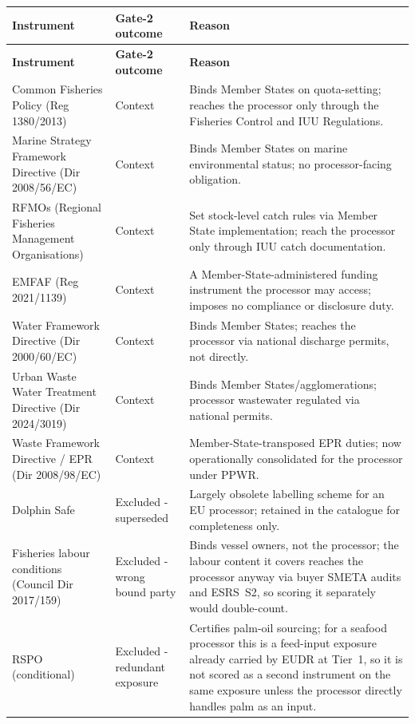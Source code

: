 \documentclass[
]{article}
\begin{document}
\begin{longtable}{@{}p{2.7cm}p{2.3cm}p{6.5cm}@{}}
\toprule
\textbf{Instrument} & \textbf{Gate-2 outcome} & \textbf{Reason} \\
\midrule
\endfirsthead
\toprule
\textbf{Instrument} & \textbf{Gate-2 outcome} & \textbf{Reason} \\
\midrule
\endhead
\bottomrule
\endfoot
Common Fisheries Policy (Reg 1380/2013) & Context & Binds Member States on quota-setting; reaches the processor only through the Fisheries Control and IUU Regulations. \\
Marine Strategy Framework Directive (Dir 2008/56/EC) & Context & Binds Member States on marine environmental status; no processor-facing obligation. \\
RFMOs (Regional Fisheries Management Organisations) & Context & Set stock-level catch rules via Member State implementation; reach the processor only through IUU catch documentation. \\
EMFAF (Reg 2021/1139) & Context & A Member-State-administered funding instrument the processor may access; imposes no compliance or disclosure duty. \\
Water Framework Directive (Dir 2000/60/EC) & Context & Binds Member States; reaches the processor via national discharge permits, not directly. \\
Urban Waste Water Treatment Directive (Dir 2024/3019) & Context & Binds Member States/agglomerations; processor wastewater regulated via national permits. \\
Waste Framework Directive / EPR (Dir 2008/98/EC) & Context & Member-State-transposed EPR duties; now operationally consolidated for the processor under PPWR. \\
Dolphin Safe & Excluded - superseded & Largely obsolete labelling scheme for an EU processor; retained in the catalogue for completeness only. \\
Fisheries labour conditions (Council Dir 2017/159) & Excluded - wrong bound party & Binds vessel owners, not the processor; the labour content it covers reaches the processor anyway via buyer SMETA audits and ESRS~S2, so scoring it separately would double-count. \\
RSPO (conditional) & Excluded - redundant exposure & Certifies palm-oil sourcing; for a seafood processor this is a feed-input exposure already carried by EUDR at Tier~1, so it is not scored as a second instrument on the same exposure unless the processor directly handles palm as an input. \\

\end{longtable}
\end{document}
